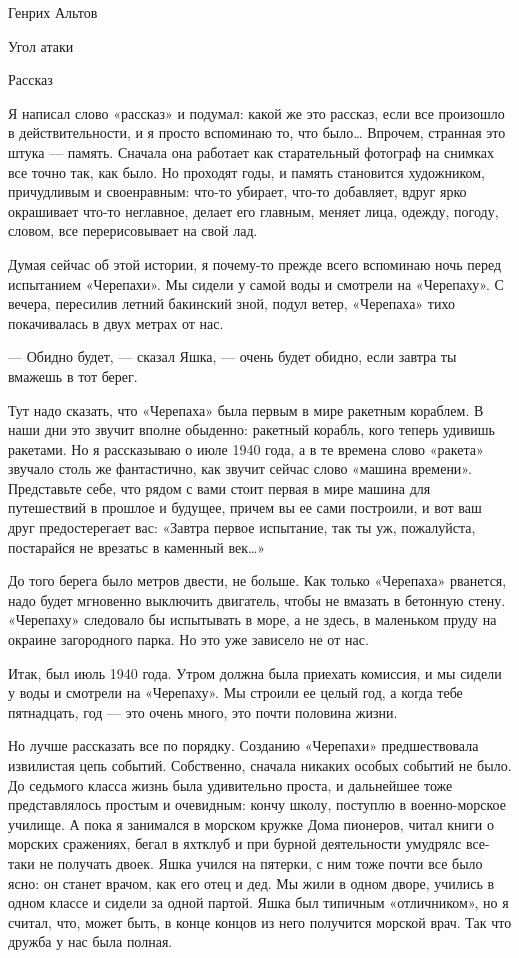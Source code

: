 
Генрих Альтов

Угол атаки


Рассказ

Я написал  слово «рассказ»  и  подумал: какой  же  это рассказ,  если  все
произошло в действительности, и я просто вспоминаю то, что было…  Впрочем,
странная это  штука  —  память.  Сначала  она  работает  как  старательный
фотограф на снимках все  точно так, как было.  Но проходят годы, и  память
становится художником, причудливым и  своенравным: что-то убирает,  что-то
добавляет, вдруг  ярко окрашивает  что-то неглавное,  делает его  главным,
меняет лица, одежду, погоду, словом, все перерисовывает на свой лад.

Думая сейчас  об этой  истории, я  почему-то прежде  всего вспоминаю  ночь
перед испытанием  «Черепахи».  Мы  сидели  у  самой  воды  и  смотрели  на
«Черепаху». С  вечера,  пересилив  летний  бакинский  зной,  подул  ветер,
«Черепаха» тихо покачивалась в двух метрах от нас.

— Обидно  будет, —  сказал Яшка,  —  очень будет  обидно, если  завтра  ты
вмажешь в тот берег.

Тут надо сказать, что «Черепаха» была  первым в мире ракетным кораблем.  В
наши дни это звучит вполне обыденно: ракетный корабль, кого теперь удивишь
ракетами. Но я рассказываю о июле 1940 года, а в те времена слово «ракета»
звучало столь же  фантастично, как звучит  сейчас слово «машина  времени».
Представьте себе,  что  рядом  с  вами стоит  первая  в  мире  машина  для
путешествий в прошлое и  будущее, причем вы ее  сами построили, и вот  ваш
друг предостерегает вас: «Завтра первое испытание, так ты уж,  пожалуйста,
постарайся не врезатьс в каменный век…»

До того  берега  было метров  двести,  не больше.  Как  только  «Черепаха»
рванется, надо будет  мгновенно выключить  двигатель, чтобы  не вмазать  в
бетонную стену. «Черепаху» следовало бы испытывать  в море, а не здесь,  в
маленьком пруду на окраине  загородного парка. Но это  уже зависело не  от
нас.

Итак, был июль 1940 года. Утром должна была приехать комиссия, и мы сидели
у воды и смотрели  на «Черепаху». Мы  строили ее целый  год, а когда  тебе
пятнадцать, год — это очень много, это почти половина жизни.

Но лучше  рассказать все  по порядку.  Созданию «Черепахи»  предшествовала
извилистая цепь  событий. Собственно,  сначала никаких  особых событий  не
было. До седьмого класса жизнь была удивительно проста, и дальнейшее  тоже
представлялось простым и очевидным: кончу школу, поступлю в военно-морское
училище. А пока я занимался в морском кружке Дома пионеров, читал книги  о
морских сражениях,  бегал в  яхтклуб и  при бурной  деятельности  умудрялс
все-таки не получать двоек. Яшка учился  на пятерки, с ним тоже почти  все
было ясно: он станет врачом,  как его отец и дед.  Мы жили в одном  дворе,
учились в  одном  классе и  сидели  за  одной партой.  Яшка  был  типичным
«отличником», но  я  считал, что,  может  быть,  в конце  концов  из  него
получится морской врач. Так что дружба у нас была полная.

